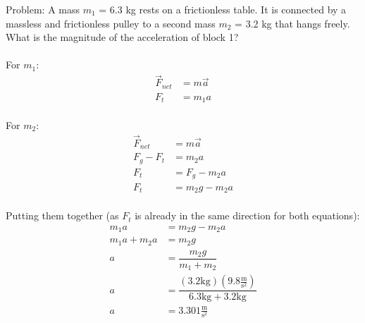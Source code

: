 \documentclass[12pt]{article}
\begin{document}
\noindent
Problem: A mass \(m_{1}\) = 6.3 kg rests on a frictionless table. It is connected by a massless and frictionless pulley to a second mass \(m_{2}\) = 3.2 kg that hangs freely. What is the magnitude of the acceleration of block 1?\\\\
For \(m_{1}\):
\begin{equation*}
  \begin{split}
    \vec{F}_{net} & = m\vec{a}\\
    F_{t} & = m_{1}a
  \end{split}
\end{equation*}\\
For \(m_{2}\):
\begin{equation*}
  \begin{split}
    \vec{F}_{net} & = m\vec{a}\\
    F_{g}-F_{t} & = m_{2}a\\
    F_{t} & = F_{g}-m_{2}a\\
    F_{t} & = m_{2}g-m_{2}a
  \end{split}
\end{equation*}\\
Putting them together (as \(F_{t}\) is already in the same direction for both equations):\\
\begin{equation*}
  \begin{split}
    m_{1}a & = m_{2}g-m_{2}a\\
    m_{1}a+m_{2}a & = m_{2}g\\
    a & = \dfrac{m_{2}g}{m_{1}+m_{2}}\\
    a & = \dfrac{(3.2\text{kg})(9.8\tfrac{\text{m}}{\text{s}^2})}{6.3\text{kg}+3.2\text{kg}}\\
    a & = 3.301\tfrac{\text{m}}{\text{s}^2}
  \end{split}
\end{equation*}
\end{document}
